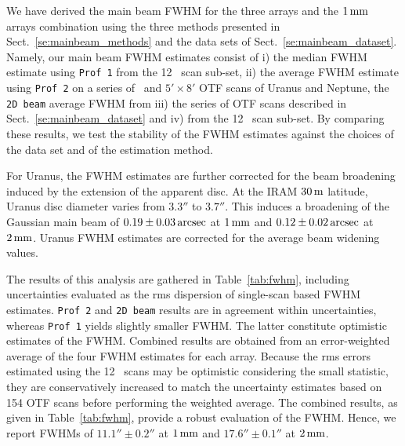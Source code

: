 We have derived the main beam FWHM for the three arrays and the
$1\,\rm{mm}$ arrays combination using the three methods presented in
Sect.~\ref{se:mainbeam_methods} and the data
sets of Sect.~\ref{se:mainbeam_dataset}.
Namely, our main beam FWHM estimates
consist of i) the median FWHM estimate using {\tt Prof 1} from the 12 \bm\ scan
sub-set, ii) the average FWHM estimate using {\tt Prof 2} on a series
of \bm\ and $5' \times 8'$ OTF scans of Uranus and Neptune, the {\tt 2D beam} average FWHM
from iii) the series of OTF scans described in
Sect.~\ref{se:mainbeam_dataset} and iv) from the 12 \bm\ scan
sub-set. By comparing these results, we test the stability of the FWHM
estimates against the choices of the data set and of the estimation
method. %

For Uranus, the
FWHM estimates are further corrected for the beam broadening induced
by the extension of the apparent disc. At the IRAM $30\,\rm{m}$
latitude, Uranus disc diameter varies from $3.3''$ to $3.7''$. This
induces a broadening of the Gaussian main beam of
$0.19 \pm 0.03\,\rm{arcsec}$ at $1\, \rm{mm}$ and $0.12 \pm 0.02\,\rm{arcsec}$
at $2\, \rm{mm}$. Uranus FWHM estimates are corrected for the average beam
widening values.

The results of this analysis are
gathered in Table~\ref{tab:fwhm}, including uncertainties evaluated as
the rms dispersion of single-scan based FWHM estimates.
{\tt Prof 2} and {\tt 2D beam} results are in agreement within
uncertainties, whereas {\tt Prof 1} yields slightly smaller FWHM.
The latter constitute optimistic estimates of the FWHM.
Combined results are obtained from an error-weighted
average of the four FWHM estimates for each array.
Because the rms errors estimated using the 12 \bm\ scans may be
optimistic considering the small statistic, they are conservatively
increased to match the uncertainty estimates based on 154 OTF scans before
performing the weighted average.  
The combined results, as given in
Table~\ref{tab:fwhm}, provide a robust evaluation of the
FWHM. Hence, we report FWHMs of $11.1'' \pm 0.2''$ at
$1\, \rm{mm}$ and $17.6''\pm 0.1''$ at $2\, \rm{mm}$.  

